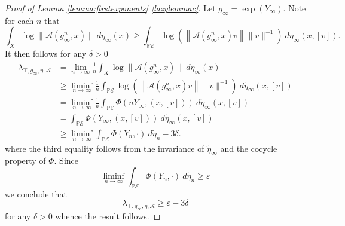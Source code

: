 \documentclass[10pt,reqno]{amsart}
\theoremstyle{Theorem}
\theoremstyle{definition}
\theoremstyle{remark}
\newcommand{\note}[1]{\marginpar{{\color{red}\footnotesize \begin{spacing}{1}#1\end{spacing}}}}
\renewcommand{\epsilon}{\varepsilon}
\newcommand{\td}{\tilde}
\newcommand{\inv}{^{-1}}
\def\calA{\mathcal A}
\def\calE{\mathcal E}
\renewcommand\P{\mathbb{P}}
\begin{document}
\begin{proof}[Proof of Lemma \ref{lemma:firstexponents} \ref{lazylemmac}]
Let $g_\infty= \exp (Y_\infty)$.  Note for each $n$ that  $$\int _X\log \|\calA(g_\infty^n, x)\| \ d \eta_\infty(x) \ge  \int _{\P \calE} \log(\left \|\calA(g_\infty^n, x) v \right \| \|v\|\inv) \ d\td  \eta_\infty (x,[v]).$$ It then follows   for any $\delta>0$ %
\begin{align*}
 \lambda_{\top, g_\infty, \eta,\calA }%
  & = \lim _{n\to \infty} \frac 1 n  \int_X \log \|\calA(g_\infty^n, x)\| \ d \eta_\infty (x)\\
 &\ge  \liminf _{n\to \infty}  \frac 1 n \int _{\P \calE} \log\left( \left \|\calA(g_\infty^n, x) v \right \| \|v\|\inv \right) \ d\td  \eta_\infty (x,[v])\\
 &=  \liminf _{n\to \infty} \frac 1 n   \int _{\P \calE} \Phi (n Y_\infty , (x,[v]))   \ d\td  \eta_\infty (x,[v])\\
 &=    \int _{\P \calE} \Phi ( Y_\infty , (x,[v]))   \ d\td  \eta_\infty (x,[v])\\
 &\ge   \liminf _{n\to \infty} \int_{ \P\calE}   \Phi(Y_n, \cdot ) \ d \td \eta_n - 3\delta.
\end{align*}
where   the third equality follows from the invariance of $\td \eta_\infty$ and the cocycle property of $\Phi$.  %
Since %
$$\liminf_{n\to \infty} \int_{ \P\calE}   \Phi(Y_n, \cdot ) \ d \td \eta_n \ge \epsilon $$
we conclude that \[\lambda_{\top, g_\infty,\eta,\calA}\ge\epsilon-3\delta\]%
for any $\delta>0$ whence the result follows.
\end{proof}
\end{document}
